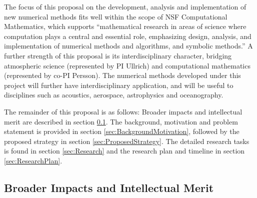 \documentclass[11pt]{article}
\begin{document}
\vspace{-0.4cm}
The focus of this proposal on the development, analysis and implementation of new numerical methods fits well within the scope of NSF Computational Mathematics, which supports ``mathematical research in areas of science where computation plays a central and essential role, emphasizing design, analysis, and implementation of numerical methods and algorithms, and symbolic methods.''  A further strength of this proposal is its interdisciplinary character, bridging atmospheric science (represented by PI Ullrich) and computational mathematics (represented by co-PI Persson).  The numerical methods developed under this project will further have interdisciplinary application, and will be useful to disciplines such as acoustics, aerospace, astrophysics and oceanography.

The remainder of this proposal is as follows:  Broader impacts and intellectual merit are described in section \ref{sec:BroaderImpacts}.  The background, motivation and problem statement is provided in section \ref{sec:BackgroundMotivation}, followed by the proposed strategy in section \ref{sec:ProposedStrategy}.  The detailed research tasks  is found in section \ref{sec:Research} and the research plan and timeline in section \ref{sec:ResearchPlan}.

\subsection{Broader Impacts and Intellectual Merit} \label{sec:BroaderImpacts}
\end{document}
